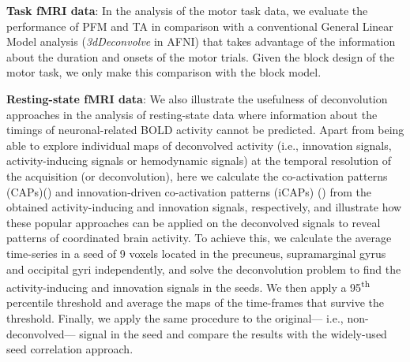 \textbf{Task fMRI data}: In the analysis of the motor task data, we evaluate the performance of PFM and TA in comparison with a conventional General Linear Model analysis (\textit{3dDeconvolve} in AFNI) that takes advantage of the information about the duration and onsets of the motor trials. Given the block design of the motor task, we only make this comparison with the block model.

\textbf{Resting-state fMRI data}: We also illustrate the usefulness of deconvolution approaches in the analysis of resting-state data where information about the timings of neuronal-related BOLD activity cannot be predicted. Apart from being able to explore individual maps of deconvolved activity (i.e., innovation signals, activity-inducing signals or hemodynamic signals) at the temporal resolution of the acquisition (or deconvolution), here we calculate the co-activation patterns (CAPs)(\citealt{Tagliazucchi2012,Liu2018Coactivationpatterns}) and innovation-driven co-activation patterns (iCAPs) (\citealt{Karahanoglu2015Transientbrainactivity}) from the obtained activity-inducing and innovation signals, respectively, and illustrate how these popular approaches can be applied on the deconvolved signals to reveal patterns of coordinated brain activity. To achieve this, we calculate the average time-series in a seed of 9 voxels located in the precuneus, supramarginal gyrus and occipital gyri independently, and solve the deconvolution problem to find the activity-inducing and innovation signals in the seeds. We then apply a 95\textsuperscript{th} percentile threshold and average the maps of the time-frames that survive the threshold. Finally, we apply the same procedure to the original--- i.e., non-deconvolved--- signal in the seed and compare the results with the widely-used seed correlation approach.